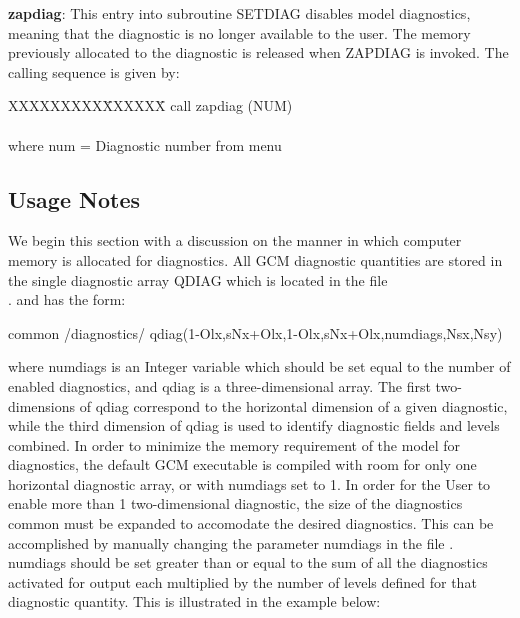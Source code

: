 \noindent
{\bf zapdiag}:  This entry into subroutine SETDIAG disables model diagnostics, meaning 
that the diagnostic is no longer available to the user.  The memory previously allocated 
to the diagnostic is released when ZAPDIAG is invoked.  The calling sequence is given by:

\noindent
\begin{tabbing}
XXXXXXXXX\=XXXXXX\= \kill
\>        call zapdiag (NUM) \\
\\
where \>  num   \>= Diagnostic number from menu \\
\end{tabbing}


\subsection{Usage Notes}
\label{sec:diagnostics:usersguide}

\noindent
We begin this section with a discussion on the manner in which computer 
memory is allocated for diagnostics. All GCM diagnostic quantities are stored in the 
single diagnostic array QDIAG which is located in the file \\
.
and has the form:

common /diagnostics/ qdiag(1-Olx,sNx+Olx,1-Olx,sNx+Olx,numdiags,Nsx,Nsy)

\noindent
where numdiags is an Integer variable which should be set equal to the number of 
enabled diagnostics, and qdiag is a three-dimensional array.  The first two-dimensions 
of qdiag correspond to the horizontal dimension of a given diagnostic, while the third 
dimension of qdiag is used to identify diagnostic fields and levels combined. In order 
to minimize the memory requirement of the model for diagnostics, the default GCM 
executable is compiled with room for only one horizontal diagnostic array, or with
numdiags set to 1. In order for the User to enable more than 1 two-dimensional diagnostic,
the size of the diagnostics common must be expanded to accomodate the desired diagnostics.
This can be accomplished by manually changing the parameter numdiags in the
file .
numdiags should be set greater than or equal to the sum of all the diagnostics activated
for output each multiplied by the number of levels defined for that diagnostic quantity.
This is illustrated in the example below:

